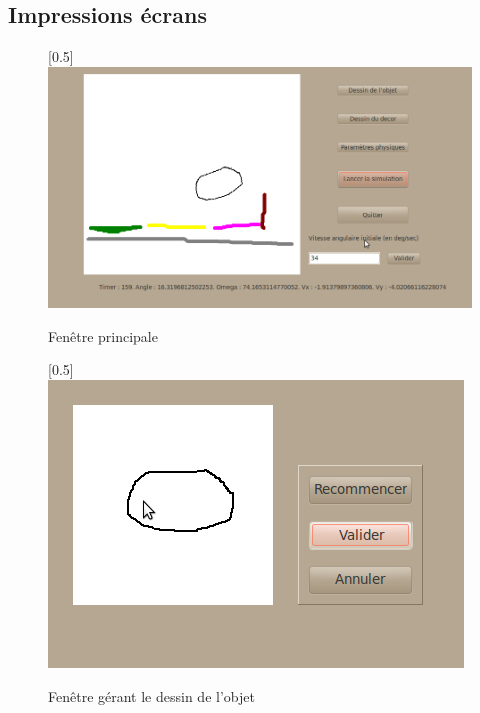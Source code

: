\newpage
\subsection{Impressions écrans}

\begin{center}
\begin{figure}[h]
\begin{center}
\scalebox{0.5}[0.5]{\includegraphics*{../images/global.jpg}}
\end{center}
\caption{Fenêtre principale}
\end{figure}
\end{center}

\begin{center}
\begin{figure}[h]
\begin{center}
\scalebox{0.5}[0.5]{\includegraphics*{../images/dessin_objet.jpg}}
\end{center}
\caption{Fenêtre gérant le dessin de l'objet}
\end{figure}
\end{center}

